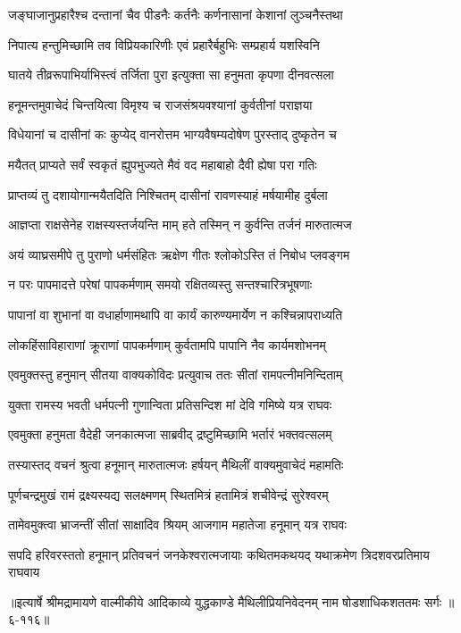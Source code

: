 \twolineshloka
{जङ्घाजानुप्रहारैश्च दन्तानां चैव पीडनैः}
{कर्तनैः कर्णनासानां केशानां लुञ्चनैस्तथा} %

\twolineshloka
{निपात्य हन्तुमिच्छामि तव विप्रियकारिणीः}
{एवं प्रहारैर्बहुभिः सम्प्रहार्य यशस्विनि} %

\twolineshloka
{घातये तीव्ररूपाभिर्याभिस्त्वं तर्जिता पुरा}
{इत्युक्ता सा हनुमता कृपणा दीनवत्सला} %

\twolineshloka
{हनूमन्तमुवाचेदं चिन्तयित्वा विमृश्य च}
{राजसंश्रयवश्यानां कुर्वतीनां पराज्ञया} %

\twolineshloka
{विधेयानां च दासीनां कः कुप्येद् वानरोत्तम}
{भाग्यवैषम्यदोषेण पुरस्ताद् दुष्कृतेन च} %

\twolineshloka
{मयैतत् प्राप्यते सर्वं स्वकृतं ह्युपभुज्यते}
{मैवं वद महाबाहो दैवी ह्येषा परा गतिः} %

\twolineshloka
{प्राप्तव्यं तु दशायोगान्मयैतदिति निश्चितम्}
{दासीनां रावणस्याहं मर्षयामीह दुर्बला} %

\twolineshloka
{आज्ञप्ता राक्षसेनेह राक्षस्यस्तर्जयन्ति माम्}
{हते तस्मिन् न कुर्वन्ति तर्जनं मारुतात्मज} %

\twolineshloka
{अयं व्याघ्रसमीपे तु पुराणो धर्मसंहितः}
{ऋक्षेण गीतः श्लोकोऽस्ति तं निबोध प्लवङ्गम} %

\twolineshloka
{न परः पापमादत्ते परेषां पापकर्मणाम्}
{समयो रक्षितव्यस्तु सन्तश्चारित्रभूषणाः} %

\twolineshloka
{पापानां वा शुभानां वा वधार्हाणामथापि वा}
{कार्यं कारुण्यमार्येण न कश्चिन्नापराध्यति} %

\twolineshloka
{लोकहिंसाविहाराणां क्रूराणां पापकर्मणाम्}
{कुर्वतामपि पापानि नैव कार्यमशोभनम्} %

\twolineshloka
{एवमुक्तस्तु हनुमान् सीतया वाक्यकोविदः}
{प्रत्युवाच ततः सीतां रामपत्नीमनिन्दिताम्} %

\twolineshloka
{युक्ता रामस्य भवती धर्मपत्नी गुणान्विता}
{प्रतिसन्दिश मां देवि गमिष्ये यत्र राघवः} %

\twolineshloka
{एवमुक्ता हनुमता वैदेही जनकात्मजा}
{साब्रवीद् द्रष्टुमिच्छामि भर्तारं भक्तवत्सलम्} %

\twolineshloka
{तस्यास्तद् वचनं श्रुत्वा हनूमान् मारुतात्मजः}
{हर्षयन् मैथिलीं वाक्यमुवाचेदं महामतिः} %

\twolineshloka
{पूर्णचन्द्रमुखं रामं द्रक्ष्यस्यद्य सलक्ष्मणम्}
{स्थितमित्रं हतामित्रं शचीवेन्द्रं सुरेश्वरम्} %

\twolineshloka
{तामेवमुक्त्वा भ्राजन्तीं सीतां साक्षादिव श्रियम्}
{आजगाम महातेजा हनूमान् यत्र राघवः} %

\twolineshloka
{सपदि हरिवरस्ततो हनूमान् प्रतिवचनं जनकेश्वरात्मजायाः}
{कथितमकथयद् यथाक्रमेण त्रिदशवरप्रतिमाय राघवाय} %


॥इत्यार्षे श्रीमद्रामायणे वाल्मीकीये आदिकाव्ये युद्धकाण्डे मैथिलीप्रियनिवेदनम् नाम षोडशाधिकशततमः सर्गः ॥६-११६॥
